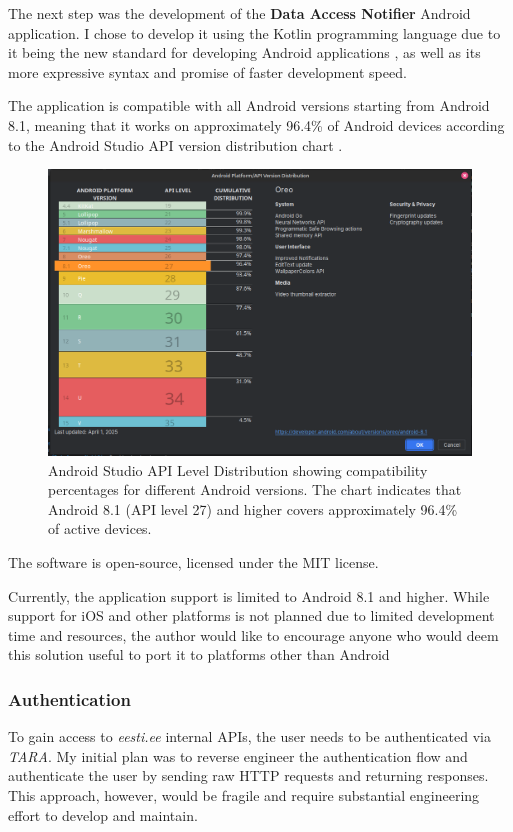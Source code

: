 The next step was the development of the \textbf{Data Access Notifier} Android application. I chose to develop it using the Kotlin programming language due to it being the new standard for developing Android applications \cite{kotlin-first}, as well as its more expressive syntax and promise of faster development speed.

The application is compatible with all Android versions starting from Android 8.1, meaning that it works on approximately 96.4\% of Android devices according to the Android Studio API version distribution chart \cite{android-api-distribution,android-studio-screenshot}.

\begin{figure}[H]
\centering
\includegraphics[width=450px]{english/figures/Screenshot from 2025-08-04 19-37-39.png}
\caption{Android Studio API Level Distribution showing compatibility percentages for different Android versions. The chart indicates that Android 8.1 (API level 27) and higher covers approximately 96.4\% of active devices.}
\label{fig:android-api-distribution}
\end{figure}

The software is open-source, licensed under the MIT license.

Currently, the application support is limited to Android 8.1 and higher. While support for iOS and other platforms is not planned due to limited development time and resources, the author would like to encourage anyone who would deem this solution useful to port it to platforms other than Android

\subsubsection{Authentication}
To gain access to \textit{eesti.ee} internal APIs, the user needs to be authenticated via \textit{TARA}. My initial plan was to reverse engineer the authentication flow and authenticate the user by sending raw HTTP requests and returning responses. This approach, however, would be fragile and require substantial engineering effort to develop and maintain.


